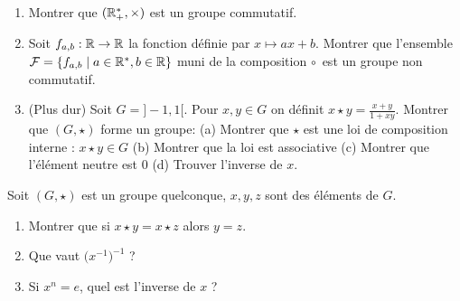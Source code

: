 \begin{frame}

\begin{miniexercice}
\begin{enumerate}

 \item Montrer que $(\mathbb{R}_+^*,\times)$ est un groupe commutatif.

 \item Soit $f_{a,b} : \mathbb{R} \to \mathbb{R}$ la fonction définie par $x \mapsto ax+b$.
Montrer que l'ensemble $\mathcal{F}=\{ f_{a,b} \mid a \in \mathbb{R}^*, b\in\mathbb{R}\}$ muni 
de la composition \og$\circ$\fg\   est un groupe non commutatif.

 \item (Plus dur) Soit $G=]-1,1[$. Pour $x,y\in G$ on définit $x\star y = \frac{x+y}{1+xy}$.
Montrer que $(G,\star)$ forme un groupe: {\footnotesize (a) Montrer que $\star$ est une loi de composition interne :
$x\star y \in G$ (b) Montrer que la loi est associative (c) Montrer que l'élément neutre est $0$
(d) Trouver l'inverse de $x$.}

\setcounter{saveenumi}{\theenumi}
\end{enumerate}
\end{miniexercice}

\medskip

Soit $(G,\star)$ est un groupe quelconque, $x,y,z$ sont des éléments de $G$.
\begin{miniexercice}
\begin{enumerate}
  \setcounter{enumi}{\thesaveenumi}
  \item Montrer que si $x\star y = x \star z$ alors $y = z$.
  \item Que vaut $\big(x^{-1}\big)^{-1}$ ?
  \item Si $x^n=e$, quel est l'inverse de $x$ ?
  \setcounter{saveenumi}{\theenumi}
\end{enumerate}
\end{miniexercice}
\end{frame}


